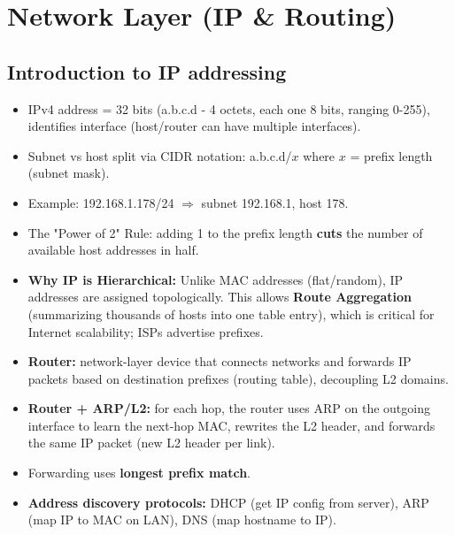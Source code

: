 \section{Network Layer (IP \& Routing)}

\subsection{Introduction to IP addressing}
\begin{itemize}
	\item IPv4 address = 32 bits (a.b.c.d - 4 octets, each one 8 bits, ranging 0-255), identifies interface (host/router can have multiple interfaces).
	\item Subnet vs host split via CIDR notation: a.b.c.d/$x$ where $x$ = prefix length (subnet mask).
	\item Example: 192.168.1.178/24 $\Rightarrow$ subnet 192.168.1, host 178.
	\item The "Power of 2" Rule: adding 1 to the prefix length \textbf{cuts} the number of available host addresses in half.
	\item \textbf{Why IP is Hierarchical:} Unlike MAC addresses (flat/random), IP addresses are assigned topologically. This allows \textbf{Route Aggregation} (summarizing thousands of hosts into one table entry), which is critical for Internet scalability; ISPs advertise prefixes.
	\item \textbf{Router:} network-layer device that connects networks and forwards IP packets based on destination prefixes (routing table), decoupling L2 domains.
	\item \textbf{Router + ARP/L2:} for each hop, the router uses ARP on the outgoing interface to learn the next-hop MAC, rewrites the L2 header, and forwards the same IP packet (new L2 header per link).
	\item Forwarding uses \textbf{longest prefix match}.
	\item \textbf{Address discovery protocols:} DHCP (get IP config from server), ARP (map IP to MAC on LAN), DNS (map hostname to IP).
\end{itemize}


